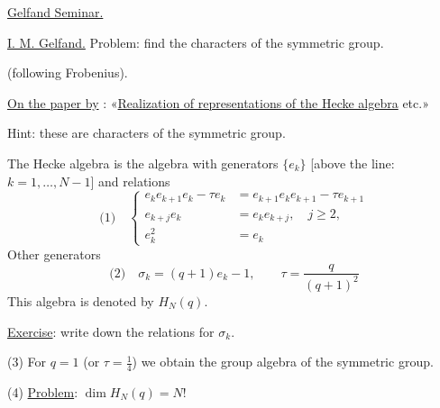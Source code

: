 
\qquad \uline{Gelfand Seminar.}

\uline{I. M. Gelfand.} Problem: find the characters of the symmetric group.

(following Frobenius).

\uline{On the paper by} : «\uline{Realization of representations of the Hecke algebra} etc.»

Hint: these are characters of the symmetric group.

The Hecke algebra is the algebra with generators \(\{e_k\}\) [above the line: \(k=1,\ldots,N-1\)] and relations
\[
\text{(1)}\quad
\left\{\begin{aligned}
e_k e_{k+1}e_k-\tau e_k&=e_{k+1}e_ke_{k+1}-\tau e_{k+1}\\
e_{k+j}e_k&=e_ke_{k+j},\quad j\geqslant 2,\\
e_k^2&=e_k
\end{aligned}\right.
\]
Other generators
\[
\text{(2)}\quad \sigma_k=(q+1)e_k-1,\qquad \tau=\frac{q}{(q+1)^2}
\]
This algebra is denoted by \(H_N(q)\).

\uline{Exercise}: write down the relations for \(\sigma_k\).

(3) For \(q=1\) (or \(\tau=\frac14\)) we obtain the group algebra of the symmetric group.

(4) \uline{Problem}: \(\dim H_N(q)=N!\)

